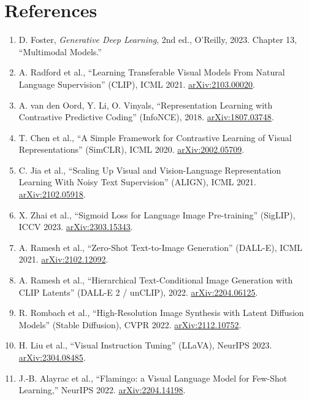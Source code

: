 \documentclass[11pt]{article}
\theoremstyle{remark}
\begin{document}
\section*{References}
\sloppy
\begin{enumerate}[leftmargin=1.8em, itemsep=2pt]
  \item D. Foster, \emph{Generative Deep Learning}, 2nd ed., O'Reilly, 2023. Chapter 13, ``Multimodal Models.''
  \item A. Radford et al., ``Learning Transferable Visual Models From Natural Language Supervision'' (CLIP), ICML 2021. \href{https://arxiv.org/abs/2103.00020}{arXiv:2103.00020}.
  \item A. van den Oord, Y. Li, O. Vinyals, ``Representation Learning with Contrastive Predictive Coding'' (InfoNCE), 2018. \href{https://arxiv.org/abs/1807.03748}{arXiv:1807.03748}.
  \item T. Chen et al., ``A Simple Framework for Contrastive Learning of Visual Representations'' (SimCLR), ICML 2020. \href{https://arxiv.org/abs/2002.05709}{arXiv:2002.05709}.
  \item C. Jia et al., ``Scaling Up Visual and Vision-Language Representation Learning With Noisy Text Supervision'' (ALIGN), ICML 2021. \href{https://arxiv.org/abs/2102.05918}{arXiv:2102.05918}.
  \item X. Zhai et al., ``Sigmoid Loss for Language Image Pre-training'' (SigLIP), ICCV 2023. \href{https://arxiv.org/abs/2303.15343}{arXiv:2303.15343}.
  \item A. Ramesh et al., ``Zero-Shot Text-to-Image Generation'' (DALL-E), ICML 2021. \href{https://arxiv.org/abs/2102.12092}{arXiv:2102.12092}.
  \item A. Ramesh et al., ``Hierarchical Text-Conditional Image Generation with CLIP Latents'' (DALL-E 2 / unCLIP), 2022. \href{https://arxiv.org/abs/2204.06125}{arXiv:2204.06125}.
  \item R. Rombach et al., ``High-Resolution Image Synthesis with Latent Diffusion Models'' (Stable Diffusion), CVPR 2022. \href{https://arxiv.org/abs/2112.10752}{arXiv:2112.10752}.
  \item H. Liu et al., ``Visual Instruction Tuning'' (LLaVA), NeurIPS 2023. \href{https://arxiv.org/abs/2304.08485}{arXiv:2304.08485}.
  \item J.-B. Alayrac et al., ``Flamingo: a Visual Language Model for Few-Shot Learning,'' NeurIPS 2022. \href{https://arxiv.org/abs/2204.14198}{arXiv:2204.14198}.

\end{enumerate}
\end{document}
